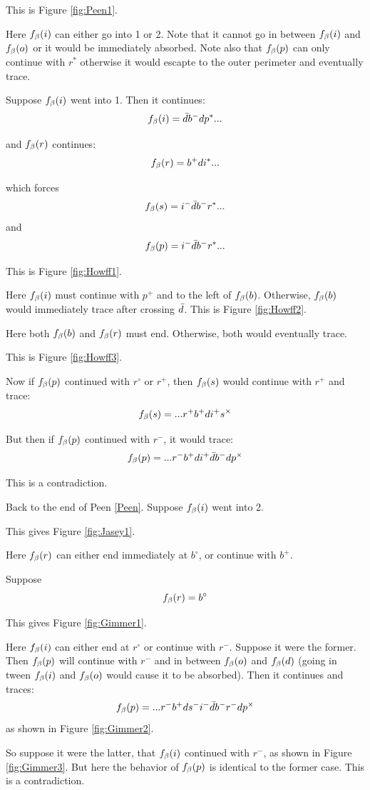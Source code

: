 This is Figure \ref{fig:Peen1}.

Here $f_\beta(i)$ can either go into 1 or 2. Note that it cannot go in between $f_\beta(i)$ and $f_\beta(o)$ or it would be immediately absorbed. Note also that $f_\beta(p)$ can only continue with $r^*$ otherwise it would escapte to the outer perimeter and eventually trace.

\label{Howff}
Suppose $f_\beta(i)$ went into 1. Then it continues:
\[
f_\beta(i) = \bar{d} b^- d p^*...
\]

and $f_\beta(r)$ continues:
\[
f_\beta(r) = b^+ d i^*...
\]

which forces
\[
f_\beta(s) = i^- \bar{d} b^- r^*...
\]
and
\[
f_\beta(p) = i^- \bar{d} b^- r^*...
\]

This is Figure \ref{fig:Howff1}.

Here $f_\beta(i)$ must continue with $p^+$ and to the left of $f_\beta(b)$. Otherwise, $f_\beta(b)$ would immediately trace after crossing $\bar{d}$. This is Figure \ref{fig:Howff2}.

Here both $f_\beta(b)$ and $f_\beta(r)$ must end. Otherwise, both would eventually trace.

This is Figure \ref{fig:Howff3}.

Now if $f_\beta(p)$ continued with $r^\circ$ or $r^+$, then $f_\beta(s)$ would continue with $r^+$ and trace:
\[
f_\beta(s) = ...r^+ b^+ d i^+ s^\times
\]

But then if $f_\beta(p)$ continued with $r^-$, it would trace:
\[
f_\beta(p) = ...r^- b^+ d i^+ \bar{d} b^- d p^\times
\]

This is a contradiction.

\label{Jasey}
Back to the end of Peen \ref{Peen}. Suppose $f_\beta(i)$ went into 2. 

This gives Figure \ref{fig:Jasey1}.

Here $f_\beta(r)$ can either end immediately at $b^\circ$, or continue with $b^+$. 

\label{Gimmer}
Suppose 
\[
f_\beta(r) = b^\circ
\]

This gives Figure \ref{fig:Gimmer1}.

Here $f_\beta(i)$ can either end at $r^\circ$ or continue with $r^-$. Suppose it were the former. Then $f_\beta(p)$ will continue with $r^-$ and in between $f_\beta(o)$ and $f_\beta(d)$ (going in tween $f_\beta(i)$ and $f_\beta(o)$ would cause it to be absorbed). Then it continues and traces:
\[
f_\beta(p) = ...r^- b^+ d s^- i^- \bar{d} b^- r^- d p^\times
\]
as shown in Figure \ref{fig:Gimmer2}.

So suppose it were the latter, that $f_\beta(i)$ continued with $r^-$, as shown in Figure \ref{fig:Gimmer3}. But here the behavior of $f_\beta(p)$ is identical to the former case. This is a contradiction.


